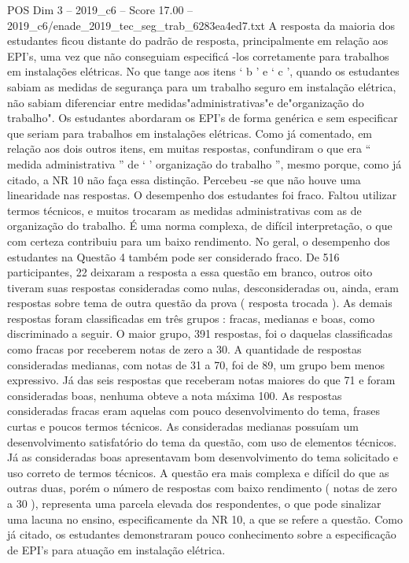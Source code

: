\begin{textsample}{POS Dim 3 – 2019\_c6 – Score 17.00 – 2019\_c6/enade\_2019\_tec\_seg\_trab\_6283ea4ed7.txt}
A resposta da maioria dos estudantes ficou distante do padrão de resposta, principalmente em relação aos EPI's, uma vez que não conseguiam especificá -los corretamente para trabalhos em instalações elétricas.
No que tange aos itens ‘ b ’ e ‘ c ’, quando os estudantes sabiam as medidas de segurança para um trabalho seguro em instalação elétrica, não sabiam diferenciar entre medidas"administrativas"e de"organização do trabalho".
Os estudantes abordaram os EPI’s de forma genérica e sem especificar que seriam para trabalhos em instalações elétricas.
Como já comentado, em relação aos dois outros itens, em muitas respostas, confundiram o que era “ medida administrativa ” de ‘ ’ organização do trabalho ”, mesmo porque, como já citado, a NR 10 não faça essa distinção.
Percebeu -se que não houve uma linearidade nas respostas.
O desempenho dos estudantes foi fraco.
Faltou utilizar termos técnicos, e muitos trocaram as medidas administrativas com as de organização do trabalho.
É uma norma complexa, de difícil interpretação, o que com certeza contribuiu para um baixo rendimento.
No geral, o desempenho dos estudantes na Questão 4 também pode ser considerado fraco.
De 516 participantes, 22 deixaram a resposta a essa questão em branco, outros oito tiveram suas respostas consideradas como nulas, desconsideradas ou, ainda, eram respostas sobre tema de outra questão da prova ( resposta trocada ).
As demais respostas foram classificadas em três grupos : fracas, medianas e boas, como discriminado a seguir.
O maior grupo, 391 respostas, foi o daquelas classificadas como fracas por receberem notas de zero a 30.
A quantidade de respostas consideradas medianas, com notas de 31 a 70, foi de 89, um grupo bem menos expressivo.
Já das seis respostas que receberam notas maiores do que 71 e foram consideradas boas, nenhuma obteve a nota máxima 100.
As respostas consideradas fracas eram aquelas com pouco desenvolvimento do tema, frases curtas e poucos termos técnicos.
As consideradas medianas possuíam um desenvolvimento satisfatório do tema da questão, com uso de elementos técnicos.
Já as consideradas boas apresentavam bom desenvolvimento do tema solicitado e uso correto de termos técnicos.
A questão era mais complexa e difícil do que as outras duas, porém o número de respostas com baixo rendimento ( notas de zero a 30 ), representa uma parcela elevada dos respondentes, o que pode sinalizar uma lacuna no ensino, especificamente da NR 10, a que se refere a questão.
Como já citado, os estudantes demonstraram pouco conhecimento sobre a especificação de EPI’s para atuação em instalação elétrica.

\end{textsample}
